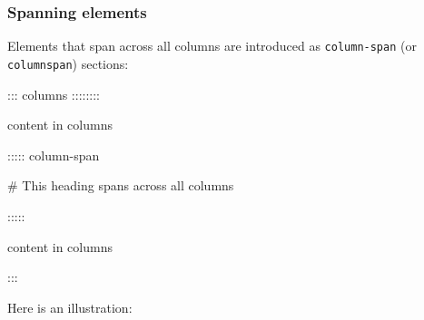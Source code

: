 \documentclass[
]{article}
\newenvironment{Shaded}{}{}
\newcommand{\NormalTok}[1]{#1}
\begin{document}
\hypertarget{spanning-elements}{%
\subsubsection{Spanning elements}\label{spanning-elements}}

Elements that span across all columns are introduced as
\texttt{column-span} (or \texttt{columnspan}) sections:

\begin{Shaded}
\begin{Highlighting}[]
\NormalTok{::: columns ::::::::}

\NormalTok{content in columns}

\NormalTok{::::: column{-}span}

\NormalTok{\# This heading spans across all columns}

\NormalTok{:::::}

\NormalTok{content in columns}

\NormalTok{:::}
\end{Highlighting}
\end{Shaded}

Here is an illustration:
\end{document}
